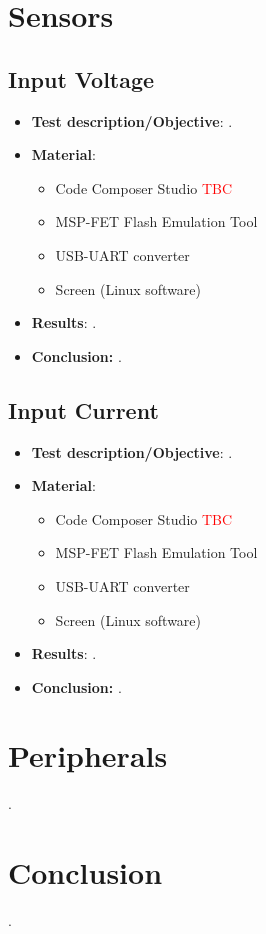 \section{Sensors}

\subsection{Input Voltage}

\begin{itemize}
    \item \textbf{Test description/Objective}: .
    \item \textbf{Material}:
        \begin{itemize}
            \item Code Composer Studio \textcolor{red}{TBC}
            \item MSP-FET Flash Emulation Tool
            \item USB-UART converter
            \item Screen (Linux software)
        \end{itemize}
    \item \textbf{Results}: .
    \item \textbf{Conclusion:} .
\end{itemize}

\subsection{Input Current}

\begin{itemize}
    \item \textbf{Test description/Objective}: .
    \item \textbf{Material}:
        \begin{itemize}
            \item Code Composer Studio \textcolor{red}{TBC}
            \item MSP-FET Flash Emulation Tool
            \item USB-UART converter
            \item Screen (Linux software)
        \end{itemize}
    \item \textbf{Results}: .
    \item \textbf{Conclusion:} .
\end{itemize}

\section{Peripherals}

.

\section{Conclusion}

.
